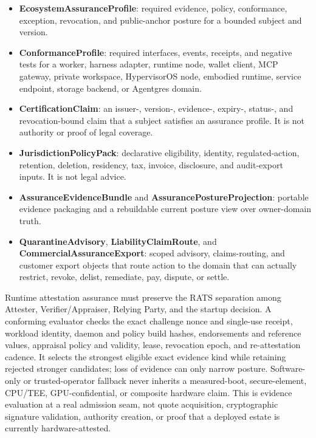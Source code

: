 \documentclass[
  11pt,
]{article}
\providecommand{\tightlist}{%
  \setlength{\itemsep}{0pt}\setlength{\parskip}{0pt}}
\begin{document}
\begin{itemize}
\tightlist
\item
  \textbf{EcosystemAssuranceProfile}: required evidence, policy,
  conformance, exception, revocation, and public-anchor posture for a bounded
  subject and version.
\item
  \textbf{ConformanceProfile}: required interfaces, events, receipts, and
  negative tests for a worker, harness adapter, runtime node, wallet client,
  MCP gateway, private workspace, HypervisorOS node, embodied runtime,
  service endpoint, storage backend, or Agentgres domain.
\item
  \textbf{CertificationClaim}: an issuer-, version-, evidence-, expiry-,
  status-, and revocation-bound claim that a subject satisfies an assurance
  profile. It is not authority or proof of legal coverage.
\item
  \textbf{JurisdictionPolicyPack}: declarative eligibility, identity,
  regulated-action, retention, deletion, residency, tax, invoice,
  disclosure, and audit-export inputs. It is not legal advice.
\item
  \textbf{AssuranceEvidenceBundle} and
  \textbf{AssurancePostureProjection}: portable evidence packaging and a
  rebuildable current posture view over owner-domain truth.
\item
  \textbf{QuarantineAdvisory}, \textbf{LiabilityClaimRoute}, and
  \textbf{CommercialAssuranceExport}: scoped advisory, claims-routing, and
  customer export objects that route action to the domain that can actually
  restrict, revoke, delist, remediate, pay, dispute, or settle.
\end{itemize}

Runtime attestation assurance must preserve the RATS separation among
Attester, Verifier/Appraiser, Relying Party, and the startup decision. A
conforming evaluator checks the exact challenge nonce and single-use receipt, workload identity,
daemon and policy build hashes, endorsements and reference values, appraisal
policy and validity, lease, revocation epoch, and re-attestation cadence. It
selects the strongest eligible exact evidence kind while retaining rejected
stronger candidates; loss of evidence can only narrow posture. Software-only
or trusted-operator fallback never inherits a measured-boot, secure-element,
CPU/TEE, GPU-confidential, or composite hardware claim. This is evidence
evaluation at a real admission seam, not quote acquisition, cryptographic
signature validation, authority creation, or proof that a deployed estate is
currently hardware-attested.
\end{document}
